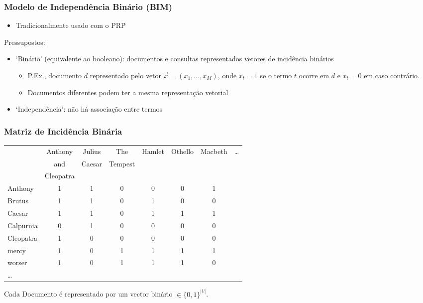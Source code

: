 \documentclass[compress]{beamer}
\def\myblue#1{\textcolor{texblue}{#1}}
\def\term#1{{\sc #1}}   %
\begin{document}
\begin{frame}[<+->]
\frametitle{Modelo de Independência Binário (BIM)}
\pause[2]

\begin{itemize}
\item Tradicionalmente usado com o PRP
\end{itemize}

Pressupostos:  
\begin{itemize}
\item `Binário' (equivalente ao booleano): documentos e consultas representados vetores de incidência binários
\begin{itemize}

\item P.Ex., documento $d$ representado pelo vetor $\vec{x} = (x_1, \ldots, x_M)$, onde $x_t = 1$ se o termo $t$ ocorre em $d$ e $x_t = 0$ em caso contrário.
\item Documentos diferentes podem ter a mesma representação vetorial
\end{itemize}

\item  `Independência': não há associação entre termos
\end{itemize}
\end{frame}

\begin{frame}[shrink=15]
\frametitle{Matriz de Incidência Binária}

\begin{tabular}{@{}lccccccc@{}}
 & Anthony  & Julius & The  & Hamlet &
 Othello & Macbeth & \ldots \\
 & and  & Caesar & Tempest &  &  &  &  \\
 & Cleopatra \\
\term{Anthony} &    1 & 1 & 0 & \myblue{0} & 0 & 1 & \\
\term{Brutus} &     1 & 1 & 0 & \myblue{1} & 0 & 0 & \\
\term{Caesar} &     1 & 1 & 0 & \myblue{1} & 1 & 1 & \\
\term{Calpurnia} &  0 & 1 & 0 & \myblue{0} & 0 & 0 & \\
\term{Cleopatra} &  1 & 0 & 0 & \myblue{0} & 0 & 0 & \\
\term{mercy} &      1 & 0 & 1 & \myblue{1} & 1 & 1 & \\
\term{worser} &     1 & 0 & 1 & \myblue{1} & 1 & 0 & \\
\ldots
\end{tabular}


\bigskip

Cada Documento é representado por um \myblue{vector binário} $\in \{0,1\}^{|V|}$.


\end{frame}
\end{document}
